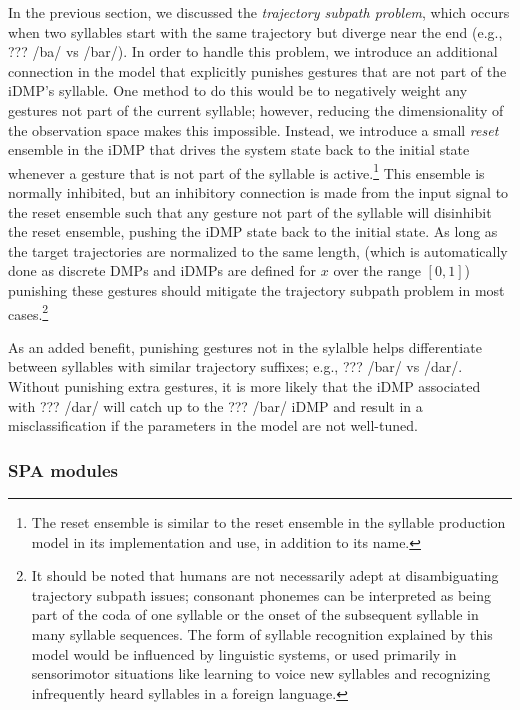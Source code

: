 In the previous section, we discussed
the \textit{trajectory subpath problem},
which occurs when two syllables
start with the same trajectory
but diverge near the end
(e.g., ??? /ba/ vs /bar/).
In order to handle this problem,
we introduce an additional connection
in the model that explicitly punishes
gestures that are not
part of the iDMP's syllable.
One method to do this would be to
negatively weight any gestures
not part of the current syllable;
however, reducing the dimensionality
of the observation space makes
this impossible.
Instead, we introduce a small \textit{reset} ensemble
in the iDMP that drives
the system state back to the initial state
whenever a gesture that is not part
of the syllable is active.\footnote{
  The reset ensemble is similar to the reset ensemble
  in the syllable production model
  in its implementation and use,
  in addition to its name.}
This ensemble is normally inhibited,
but an inhibitory connection is made
from the input signal to the reset ensemble
such that any gesture
not part of the syllable will
disinhibit the reset ensemble,
pushing the iDMP state back to the initial state.
As long as the target trajectories
are normalized to the same length,
(which is automatically done
as discrete DMPs and iDMPs
are defined for $x$ over the range $[0, 1]$)
punishing these gestures should
mitigate the trajectory subpath problem
in most cases.\footnote{
  It should be noted that humans
  are not necessarily adept at
  disambiguating trajectory subpath issues;
  consonant phonemes can be interpreted
  as being part of the coda of one syllable
  or the onset of the subsequent syllable
  in many syllable sequences.
  The form of syllable recognition
  explained by this model would
  be influenced by linguistic systems,
  or used primarily in sensorimotor situations
  like learning to voice new syllables
  and recognizing infrequently heard syllables
  in a foreign language.}

As an added benefit,
punishing gestures not in the sylalble helps
differentiate between syllables with
similar trajectory suffixes;
e.g., ??? /bar/ vs /dar/.
Without punishing extra gestures,
it is more likely that the iDMP
associated with ??? /dar/ will catch up
to the ??? /bar/ iDMP
and result in a misclassification
if the parameters in the model
are not well-tuned.

\subsubsection{SPA modules}

